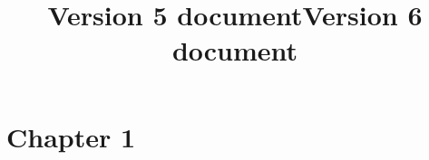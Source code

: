 \documentclass{book}
\title{Version 5 document}
\title{Version 6 document}
\begin{document}
\maketitle
    \chapter{Chapter 1}
    \iftoggle{cover}{%
      \section{Version 5 section}
    }{%
      \section{Version 6 section}
    }%
\end{document}
